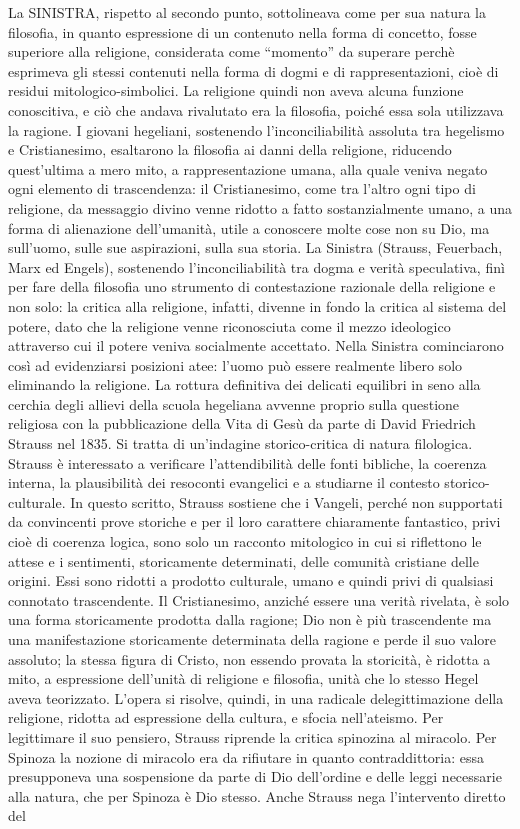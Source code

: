\documentclass[a4paper,12pt,oneside,openany]{book}%
\begin{document}
La SINISTRA, rispetto al secondo punto, sottolineava come per sua natura la filosofia, in quanto espressione di un contenuto nella forma di concetto, fosse superiore alla religione, considerata come “momento” da superare perchè esprimeva gli stessi contenuti nella forma di dogmi e di rappresentazioni, cioè di residui mitologico-simbolici. La religione quindi non aveva alcuna funzione conoscitiva, e ciò che andava rivalutato era la filosofia, poiché essa sola utilizzava la ragione. I giovani hegeliani, sostenendo l’inconciliabilità assoluta tra hegelismo e Cristianesimo, esaltarono la filosofia ai danni della religione, riducendo quest’ultima a mero mito, a rappresentazione umana, alla quale veniva negato ogni elemento di trascendenza: il Cristianesimo, come tra l’altro ogni tipo di religione, da messaggio divino venne ridotto a fatto sostanzialmente umano, a una forma di alienazione dell’umanità, utile a conoscere molte cose non su Dio, ma sull’uomo, sulle sue aspirazioni, sulla sua storia. La Sinistra (Strauss, Feuerbach, Marx ed Engels), sostenendo l’inconciliabilità tra dogma e verità speculativa, finì per fare della filosofia uno strumento di contestazione razionale della religione e non solo: la critica alla religione, infatti, divenne in fondo la critica al sistema del potere, dato che la religione venne riconosciuta come il mezzo ideologico attraverso cui il potere veniva socialmente accettato. Nella Sinistra cominciarono così ad evidenziarsi posizioni atee: l’uomo può essere realmente libero solo eliminando la religione. La rottura definitiva dei delicati equilibri in seno alla cerchia degli allievi della scuola hegeliana avvenne proprio sulla questione religiosa con la pubblicazione della Vita di Gesù da parte di David Friedrich Strauss nel 1835. Si tratta di un’indagine storico-critica di natura filologica. Strauss è interessato a verificare l’attendibilità delle fonti bibliche, la coerenza interna, la plausibilità dei resoconti evangelici e a studiarne il contesto storico-culturale.  In questo scritto, Strauss sostiene che i Vangeli, perché non supportati da convincenti prove storiche e per il loro carattere chiaramente fantastico, privi cioè di coerenza logica, sono solo un racconto mitologico in cui si riflettono le attese e i sentimenti, storicamente determinati, delle comunità cristiane delle origini. Essi sono ridotti a prodotto culturale, umano e quindi privi di qualsiasi connotato trascendente. Il Cristianesimo, anziché essere una verità rivelata, è solo una forma storicamente prodotta dalla ragione; Dio non è più trascendente ma una manifestazione storicamente determinata della ragione e perde il suo valore assoluto; la stessa figura di Cristo, non essendo provata la storicità, è ridotta a mito, a espressione dell’unità di religione e filosofia, unità che lo stesso Hegel aveva teorizzato. L’opera si risolve, quindi, in una radicale delegittimazione della religione, ridotta ad espressione della cultura, e sfocia nell’ateismo. Per legittimare il suo pensiero, Strauss riprende la critica spinozina al miracolo. Per Spinoza la nozione di miracolo era da rifiutare in quanto contraddittoria: essa presupponeva una sospensione da parte di Dio dell’ordine e delle leggi necessarie alla natura, che per Spinoza è Dio stesso. Anche Strauss nega l’intervento diretto del 
\end{document}
